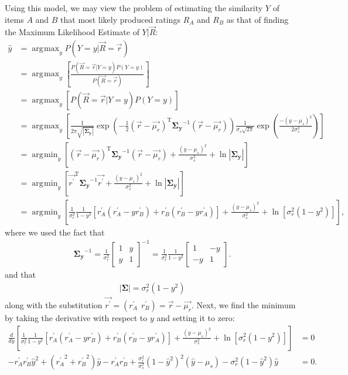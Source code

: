 \documentclass[11pt]{article}
\DeclareMathOperator*{\argmax}{arg\!\max}
\DeclareMathOperator*{\argmin}{arg\!\min}
\begin{document}
Using this model, we may view the problem of estimating the similarity $Y$ of
items $A$ and $B$ that most likely produced ratings $R_A$ and $R_B$ as
that of finding the Maximum Likelihood Estimate of $Y | \vec{R}$:
\begin{align}
\hat{y} &= \argmax_yP(Y=y|\vec{R}=\vec{r}) 
\\&= \argmax_y\left[\frac{P(\vec{R}=\vec{r} |
Y=y)P(Y=y)}{P(\vec{R}=\vec{r})}\right]
\\&= \argmax_y\left[P(\vec{R}=\vec{r}|Y=y)P(Y=y)\right]
\\&=
\argmax_y\left[\frac{1}{2\pi\sqrt{\left|\mathbf{\Sigma_y}\right|}}\exp{\left(-\frac{1}{2}
(\vec{r} - \vec{\mu_r})^\mathrm{T}\mathbf{\Sigma_y}^{-1}(\vec{r} - \vec{\mu_r})\right)}
\frac{1}{\sigma_{s}\sqrt{2\pi}}\exp{\left(\frac{-(y-\mu_s)^2}
{2\sigma_{s}^2}\right)}\right]
\\&= \argmin_y\left[(\vec{r} -
\vec{\mu_r})^\mathrm{T}\mathbf{\Sigma_y}^{-1}(\vec{r} - \vec{\mu_r}) + \frac{(y -
\mu_s)^2}{\sigma_{s}^2} + \ln{\left|\mathbf{\Sigma_y}\right|} \right]
\\&=
\argmin_y\left[\vec{r^\prime}^\mathrm{T}\mathbf{\Sigma_y}^{-1}\vec{r^\prime}
 + \frac{(y - \mu_s)^2}{\sigma_{s}^2} + \ln{\left|\mathbf{\Sigma_y}\right|} \right]
\\&= \argmin_y\left[\frac{1}{\sigma_r^2}\frac{1}{1 -
y^2}\left[r_A^\prime(r_A^\prime - yr_B^\prime) + r_B^\prime(r_B^\prime -
yr_A^\prime)\right] + \frac{(y - \mu_s)^2}{\sigma_{s}^2} +
\ln{\left[\sigma_r^2(1 - y^2)\right]} \right],
\end{align}
where we used the fact that
\begin{align}
\mathbf{\Sigma_y}^{-1} = \frac{1}{\sigma_r^2}
\left[ \begin{array}{cc}  1 & y \\ y & 1 \end{array} \right]^{-1} =
\frac{1}{\sigma_r^2}\frac{1}{1 - y^2}\left[ \begin{array}{cc}  1 & -y \\ -y & 1
\end{array} \right].
\end{align}
and that
\begin{align}
\left|\mathbf{\Sigma}\right| = \sigma_r^2(1 - y^2)
\end{align}
along with the substitution $\vec{r^\prime} = (r_A^\prime~~r_B^\prime) = \vec{r}
- \vec{\mu_r}$. Next, we find the minimum by taking the derivative with respect
to $y$ and setting it to zero:
\begin{align}
\frac{d}{dy}\left[ \frac{1}{\sigma_r^2}\frac{1}{1 -
y^2}\left[r_A^\prime(r_A^\prime - yr_B^\prime) + r_B^\prime(r_B^\prime -
yr_A^\prime)\right] + \frac{(y - \mu_s)^2}{\sigma_{s}^2} +
\ln{\left[\sigma_r^2(1 - y^2)\right]} \right] &= 0 \\
-r_A^\prime r_B^\prime \hat{y}^2 + ({r_A^\prime}^2 + {r_B^\prime}^2)\hat{y} - r_A^\prime
r_B^\prime + \frac{\sigma_r^2}{\sigma_s^2}(1 - \hat{y}^2)^2(\hat{y} - \mu_s) - \sigma_r^2(1
- \hat{y}^2)\hat{y} &= 0.
\end{align}
\end{document}
